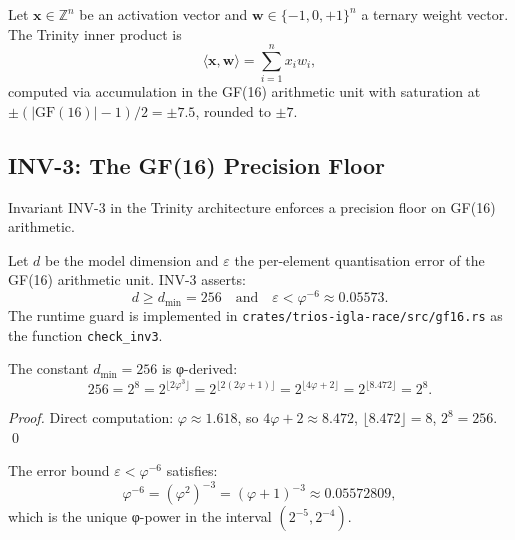 \begin{definition}
\label{def:gf16-inner}
Let \(\mathbf{x}\in\mathbb{Z}^n\) be an activation vector and
\(\mathbf{w}\in\{-1,0,+1\}^n\) a ternary weight vector.
The Trinity inner product is
\[
  \langle \mathbf{x}, \mathbf{w}\rangle
    = \sum_{i=1}^{n} x_i w_i,
\]
computed via accumulation in the GF(16) arithmetic unit with
saturation at \(\pm(|\mathrm{GF}(16)|-1)/2 = \pm 7.5\), rounded to \(\pm 7\).
\end{definition}

\subsection{INV-3: The GF(16) Precision Floor}
\label{sec:gf16-inv3}

Invariant INV-3 in the Trinity architecture enforces a precision floor
on GF(16) arithmetic.

\begin{definition}
\label{def:inv3}
Let \(d\) be the model dimension and \(\varepsilon\) the per-element
quantisation error of the GF(16) arithmetic unit.
INV-3 asserts:
\[
  d \geq d_{\min} = 256
  \quad\text{and}\quad
  \varepsilon < \varphi^{-6} \approx 0.05573.
\]
The runtime guard is implemented in
\texttt{crates/trios-igla-race/src/gf16.rs}
as the function \texttt{check\_inv3}.
\end{definition}

\begin{lemma}
\label{lem:dmin-phi}
The constant \(d_{\min}=256\) is φ-derived:
\[
  256 = 2^8 = 2^{\lfloor 2\varphi^3\rfloor}
      = 2^{\lfloor 2(2\varphi+1)\rfloor}
      = 2^{\lfloor 4\varphi+2\rfloor}
      = 2^{\lfloor 8.472\rfloor}
      = 2^8.
\]
\end{lemma}

\begin{proof}
Direct computation: \(\varphi\approx 1.618\), so
\(4\varphi+2\approx 8.472\), \(\lfloor 8.472\rfloor=8\), \(2^8=256\).
\qed
\end{proof}

\begin{proposition}
\label{prop:eps-phi}
The error bound \(\varepsilon < \varphi^{-6}\) satisfies:
\[
  \varphi^{-6} = (\varphi^2)^{-3} = (\varphi+1)^{-3}
    \approx 0.05572809,
\]
which is the unique φ-power in the interval \((2^{-5},2^{-4})\).
\end{proposition}

